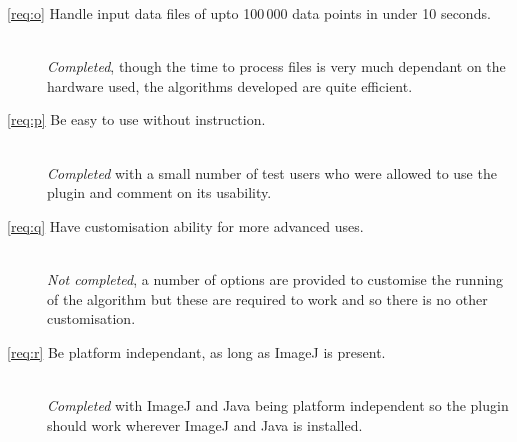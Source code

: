\begin{description}
	\item[\ref{req:o} Handle input data files of upto 100\,000 data points in
		under 10 seconds.]
		\hfill \\ \emph{Completed}, though the time to process files is very
		much dependant on the hardware used, the algorithms developed are quite
		efficient.

	\item[\ref{req:p} Be easy to use without instruction.]
		\hfill \\ \emph{Completed} with a small number of test users who were
		allowed to use the plugin and comment on its usability.

	\item[\ref{req:q} Have customisation ability for more advanced uses.]
		\hfill \\ \emph{Not completed}, a number of options are provided to
		customise the running of the algorithm but these are required to work
		and so there is no other customisation.

	\item[\ref{req:r} Be platform independant, as long as ImageJ is
		present.]
		\hfill \\ \emph{Completed} with ImageJ and Java being platform
		independent so the plugin should work wherever ImageJ and Java is
		installed.
\end{description}
